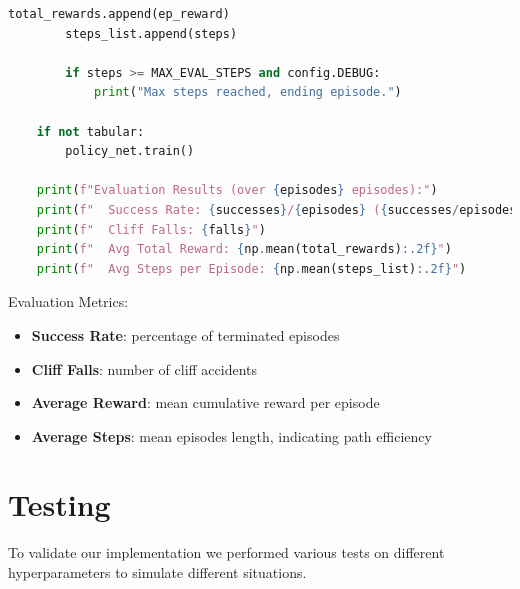\documentclass[a4paper,12pt]{article}
\begin{document}
\begin{lstlisting}[language=Python]
        total_rewards.append(ep_reward)
        steps_list.append(steps)

        if steps >= MAX_EVAL_STEPS and config.DEBUG:
            print("Max steps reached, ending episode.")

    if not tabular:
        policy_net.train()

    print(f"Evaluation Results (over {episodes} episodes):")
    print(f"  Success Rate: {successes}/{episodes} ({successes/episodes*100:.1f}%)")
    print(f"  Cliff Falls: {falls}")
    print(f"  Avg Total Reward: {np.mean(total_rewards):.2f}")
    print(f"  Avg Steps per Episode: {np.mean(steps_list):.2f}")
\end{lstlisting}
Evaluation Metrics:
\begin{itemize}
    \item \textbf{Success Rate}: percentage of terminated episodes
    \item \textbf{Cliff Falls}: number of cliff accidents
    \item \textbf{Average Reward}: mean cumulative reward per episode
    \item \textbf{Average Steps}: mean episodes length, indicating path efficiency
\end{itemize}
\section{Testing}
To validate our implementation we performed various tests on different hyperparameters to simulate different situations.
\end{document}
